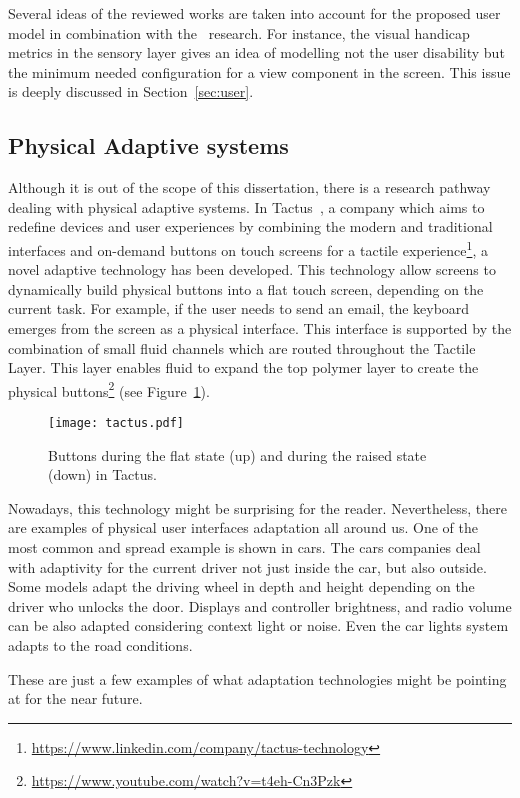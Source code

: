 Several ideas of the reviewed works are taken into account for the proposed user 
model in combination with the~\citet{casas_user_2008} research. For instance,
the visual handicap metrics in the sensory layer gives an idea of modelling
not the user disability but the minimum needed configuration for a view component
in the screen. This issue is deeply discussed in Section~\ref{sec:user}.

\subsection{Physical Adaptive systems}
\label{sec:pyshical_adaptive_sistems}

Although it is out of the scope of this dissertation, there is a research
pathway dealing with physical adaptive systems. In Tactus~\citep{tactus}, a
company which aims to redefine devices and user experiences by combining the 
modern and traditional interfaces and on-demand buttons on touch
screens for a tactile experience\footnote{\url{https://www.linkedin.com/company/tactus-technology}}, a novel adaptive
technology has been developed. This technology allow screens to dynamically build
physical buttons into a flat touch screen, depending on the current task. For example,
if the user needs to send an email, the keyboard emerges from the screen
as a physical interface. This interface is supported by the combination of
small fluid channels which are routed throughout the Tactile Layer. This layer
enables fluid to expand the top polymer layer to create the physical
buttons\footnote{\url{https://www.youtube.com/watch?v=t4eh-Cn3Pzk}} (see
Figure~\ref{fig:tactus}).

\begin{figure}[H]
\centering
\texttt{[image: tactus.pdf]}
\caption{Buttons during the flat state (up) and during the raised state (down) in Tactus.}
\label{fig:tactus}
\end{figure}

Nowadays, this technology might be surprising for the reader. Nevertheless, there
are examples of physical user interfaces adaptation all around us. One of the most
common and spread example is shown in cars. The cars companies deal with adaptivity
for the current driver not just inside the car, but also outside. Some models
adapt the driving wheel in depth and height depending on the driver who unlocks
the door. Displays and controller brightness, and radio volume can be also
adapted considering context light or noise. Even the car lights system adapts
to the road conditions.

These are just a few examples of what adaptation technologies might be pointing 
at for the near future.



